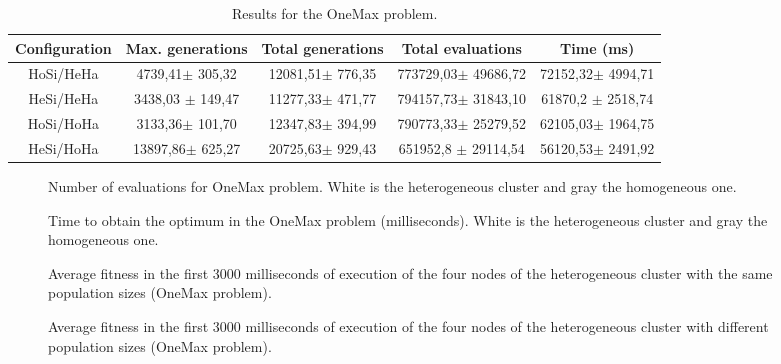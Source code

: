 \documentclass{sig-alternate}
\begin{document}
\begin{table*}
\centering
\caption{Results for the OneMax problem.}
\begin{tabular}{|c|c|c|c|c|} \hline
Configuration	& Max. generations			& Total generations			& 	Total evaluations			& Time (ms) \\ \hline
HoSi/HeHa		& 4739,41$\pm$	305,32 		&	12081,51$\pm$	776,35 	&	773729,03$\pm$	49686,72 	&	72152,32$\pm$	4994,71 \\ \hline
HeSi/HeHa		&	3438,03 $\pm$	149,47 &	11277,33$\pm$	471,77 &	794157,73$\pm$	31843,10 	&	61870,2	$\pm$ 2518,74 \\ \hline
HoSi/HoHa		&	3133,36$\pm$	101,70 	&	12347,83$\pm$	394,99 	&	790773,33$\pm$	25279,52 	&	62105,03$\pm$	1964,75 \\ \hline
HeSi/HoHa		& 13897,86$\pm$	625,27 		&	20725,63$\pm$	929,43 	&	651952,8 $\pm$	29114,54	&	56120,53$\pm$	2491,92 \\ \hline
\end{tabular}
\label{tab:onemaxresults}
\end{table*}

\begin{figure}
\centering
{}
\caption{Number of evaluations for OneMax problem. White is the heterogeneous cluster and gray the homogeneous one.}
\label{fig:evalsOneMax}
\end{figure}

\begin{figure}
\centering
{}
\caption{Time to obtain the optimum in the OneMax problem (milliseconds). White is the heterogeneous cluster and gray the homogeneous one.}
\label{fig:timeOneMax}
\end{figure}

\begin{figure}
\centering
{}
\caption{Average fitness in the first 3000 milliseconds of execution of the four nodes of the heterogeneous cluster with the same population sizes (OneMax problem).}
\label{fig:gensonemaxhomosize}
\end{figure}

\begin{figure}
\centering
{}
\caption{Average fitness in the first 3000 milliseconds of execution of the four nodes of the heterogeneous cluster with different population sizes (OneMax problem).}
\label{fig:gensonemaxheterosize}
\end{figure}
\end{document}
